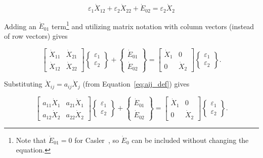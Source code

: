 \begin{equation} \label{eq:Casler-4}
	\varepsilon_{1} \dot{X}_{12}
	+ \varepsilon_{2} \dot{X}_{22}
	+ \dot{E}_{02}
	= \varepsilon_{2} \dot{X}_{2}
\end{equation}

\noindent{}Adding an $\dot{E}_{01}$ term\footnote{Note that 
$\dot{E}_{01} = 0$ for Casler~\cite{Casler1984}, 
so $\dot{E}_{0}$ can be included without changing the equation.} 
and utilizing matrix notation with column vectors 
(instead of row vectors) gives

\begin{equation} \label{eq:Casler34-matrix}
	\begin{bmatrix}
		\dot{X}_{11} & \dot{X}_{21} \\
		\dot{X}_{12} & \dot{X}_{22}
	\end{bmatrix}
	\begin{Bmatrix}
		\varepsilon_{1} \\
		\varepsilon_{2}
	\end{Bmatrix}
	+
	\begin{Bmatrix}
		\dot{E}_{01} \\
		\dot{E}_{02}
	\end{Bmatrix}
	=
	\begin{bmatrix}
		\dot{X}_{1} & 0 \\
		0           & \dot{X}_{2}
	\end{bmatrix}
	\begin{Bmatrix}
		\varepsilon_{1} \\
		\varepsilon_{2}
	\end{Bmatrix}.
\end{equation}

\noindent{}Substituting $\dot{X}_{ij} = a_{ij} \dot{X}_{j}$ (from 
Equation~\ref{eq:aij_def}) gives

\begin{equation} \label{eq:Casler34-matrix-with-a}
	\begin{bmatrix}
		a_{11} \dot{X}_{1} & a_{21} \dot{X}_{1} \\
		a_{12} \dot{X}_{2} & a_{22} \dot{X}_{2}
	\end{bmatrix}
	\begin{Bmatrix}
		\varepsilon_{1} \\
		\varepsilon_{2}
	\end{Bmatrix}
	+
	\begin{Bmatrix}
		\dot{E}_{01} \\
		\dot{E}_{02}
	\end{Bmatrix}
	=
	\begin{bmatrix}
		\dot{X}_{1} & 0 \\
		0           & \dot{X}_{2}
	\end{bmatrix}
	\begin{Bmatrix}
		\varepsilon_{1} \\
		\varepsilon_{2}
	\end{Bmatrix}.
\end{equation}

